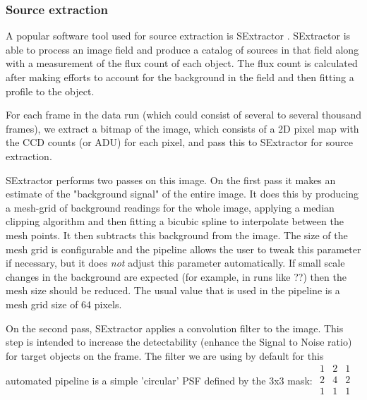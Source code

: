\subsubsection{Source extraction}
A popular software tool used for source extraction is SExtractor \cite{bertin}. SExtractor is able to process an image field and produce a catalog of sources in that field along with a measurement of the flux count of each object. The flux count is calculated after making efforts to account for the background in the field and then fitting a profile to the object. 

For each frame in the data run (which could consist of several to several thousand frames), we extract a bitmap of the image, which consists of a 2D pixel map with the CCD counts (or ADU) for each pixel, and pass this to SExtractor for source extraction. 

SExtractor performs two passes on this image. On the first pass it makes an estimate of the "background signal" of the entire image. It does this by producing a mesh-grid of background readings for the whole image, applying a median clipping algorithm and then fitting a bicubic spline to interpolate between the mesh points. It then subtracts this background from the image. The size of the mesh grid is configurable and the pipeline allows the user to tweak this parameter if necessary, but it does \emph{not} adjust this parameter automatically. If small scale changes in the background are expected (for example, in runs like ??) then the mesh size should be reduced. The usual value that is used in the pipeline is a mesh grid size of 64 pixels.

On the second pass, SExtractor applies a convolution filter to the image. This step is intended to increase the detectability (enhance the Signal to Noise ratio) for target objects on the frame. The filter we are using by default for this automated pipeline is a simple 'circular' PSF defined by the 3x3 mask:
$
\begin{array}{ccc}
  1 & 2 & 1 \\
  2 & 4 & 2 \\
  1 & 1 & 1 \\
\end{array}  
$

